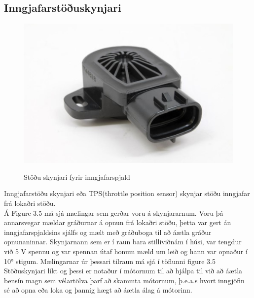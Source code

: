 \documentclass[paper=a4, fontsize=11pt]{scrartcl}
\numberwithin{equation}{section}		%
\numberwithin{figure}{section}			%
\numberwithin{table}{section}				%
\begin{document}
\subsection{Inngjafarstöðuskynjari}
\begin{figure}
	\begin{center}
		\includegraphics[]{tps.jpg}\\
        \caption{Stöðu skynjari fyrir inngjafarspjald}
	\end{center}
\end{figure}
Inngjafarstöðu skynjari eða TPS(throttle position sensor) skynjar stöðu inngjafar frá lokaðri stöðu.\\
Á Figure 3.5 má sjá mælingar sem gerðar voru á skynjararnum. Voru þá annarsvegar mældar gráðurnar á opnun frá lokaðri stöðu, þetta var gert án inngjafarspjaldsins sjálfs og mælt með gráðuboga til að áætla gráður opnunaninnar. Skynjarnann sem er í raun bara stilliviðnám í húsi, var tengdur við 5 V spennu og var spennan útaf honum mæld um leið og hann var opnaður í 10° stigum. Mælingarnar úr þessari tilraun má sjá í töflunni figure 3.5\\
Stöðuskynjari líkt og þessi er notaður í mótornum til að hjálpa til við að áætla bensín magn sem vélartölva þarf að skammta mótornum, þ.e.a.s hvort inngjöfin sé að opna eða loka og þannig hægt að áætla álag á mótorinn.
\end{document}
